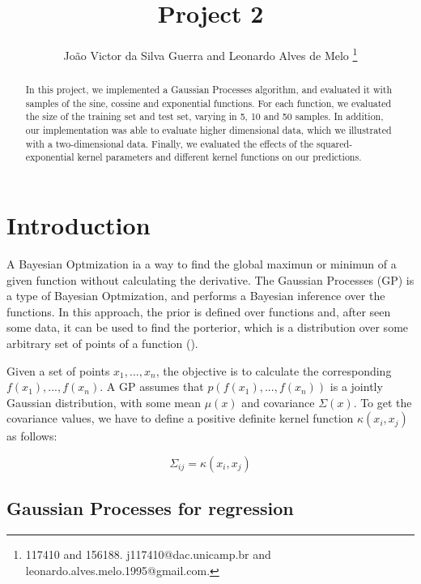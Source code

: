 \documentclass{article}
\begin{document}
\title{Project 2}
\author{
Jo\~ao Victor da Silva Guerra 
and
Leonardo Alves de Melo
\thanks{117410 and 156188. j117410@dac.unicamp.br and leonardo.alves.melo.1995@gmail.com.}
}

\maketitle

\begin{abstract}
In this project, we implemented a Gaussian Processes algorithm, and evaluated it with samples of the sine, cossine and exponential functions. For each function, we evaluated the size of the training set and test set, varying in 5, 10 and 50 samples. In addition, our implementation was able to evaluate higher dimensional data, which we illustrated with a two-dimensional data. Finally, we evaluated the effects of the  squared-exponential kernel parameters and different kernel functions on our predictions.
\end{abstract}

\section{Introduction}

A Bayesian Optmization ia a way to find the global maximun or minimun of a given function without calculating the derivative. The Gaussian Processes (GP) is a type of Bayesian Optmization, and performs a Bayesian inference over the functions. In this approach, the prior is defined over functions and, after seen some data, it can be used to find the porterior, which is a distribution over some arbitrary set of points of a function (\cite{murphy2012}).

Given a set of points $ x_1, ..., x_n $, the objective is to calculate the corresponding $ f(x_1), ..., f(x_n) $. A GP assumes that $ p(f(x_1), ..., f(x_n)) $ is a jointly Gaussian distribution, with some mean $\mu(x)$ and covariance $\Sigma(x)$. To get the covariance values, we have to define a positive definite kernel function $\kappa(x_i, x_j)$ as follows:

\begin{equation}
  \Sigma_{ij} = \kappa(x_i, x_j)
  \label{eq:covariance}
\end{equation}

\subsection{Gaussian Processes for regression}
\end{document}
